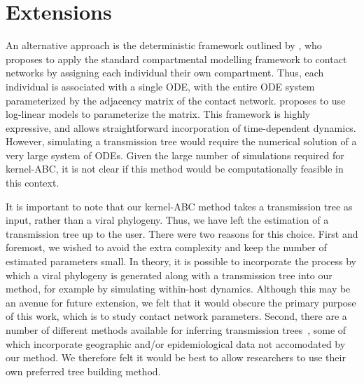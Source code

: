 \section{Extensions}


An alternative approach is the deterministic framework outlined by
\textcite{morris1993epidemiology}, who proposes to apply the standard
compartmental modelling framework to contact networks by assigning each
individual their own compartment. Thus, each individual is associated with a
single \gls{ODE}, with the entire \gls{ODE} system parameterized by the
adjacency matrix of the contact network. \citeauthor{morris1993epidemiology}
proposes to use log-linear models to parameterize the matrix. This framework is
highly expressive, and allows straightforward incorporation of time-dependent
dynamics. However, simulating a transmission tree would require the numerical
solution of a very large system of \glspl{ODE}. Given the large number of
simulations required for kernel-\gls{ABC}, it is not clear if this method would
be computationally feasible in this context.



It is important to note that our kernel-ABC method takes a transmission tree as
input, rather than a viral phylogeny. Thus, we have left the estimation of a
transmission tree up to the user. There were two reasons for this choice. First
and foremost, we wished to avoid the extra complexity and keep the number of
estimated parameters small. In theory, it is possible to incorporate the
process by which a viral phylogeny is generated along with a transmission tree
into our method, for example by simulating within-host dynamics. Although this
may be an avenue for future extension, we felt that it would obscure the
primary purpose of this work, which is to study contact network parameters.
Second, there are a number of different methods available for inferring
transmission trees~\autocite{didelot2014bayesian, yima2012unravelling,
jombart2011reconstructing, cottam2008integrating, poon2015phylodynamic}, some
of which incorporate geographic and/or epidemiological data not accomodated by
our method. We therefore felt it would be best to allow researchers to use
their own preferred tree building method.
